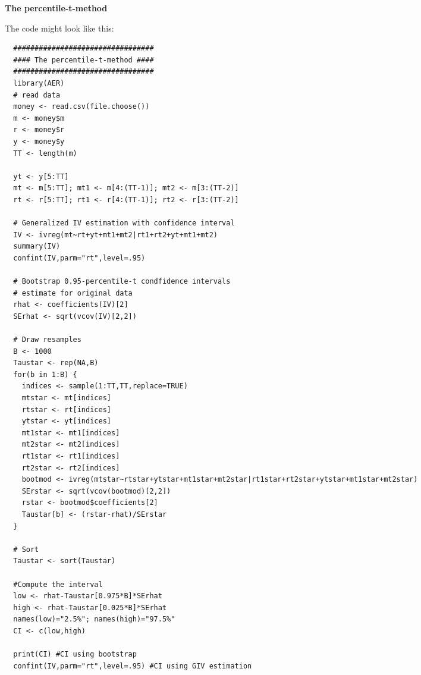 \begin{Solution}{16.5}
\textbf{The percentile-t-method }

The code might look like this:
\begin{verbatim}
  #################################
  #### The percentile-t-method ####
  #################################
  library(AER)
  # read data
  money <- read.csv(file.choose())
  m <- money$m
  r <- money$r
  y <- money$y
  TT <- length(m)

  yt <- y[5:TT]
  mt <- m[5:TT]; mt1 <- m[4:(TT-1)]; mt2 <- m[3:(TT-2)]
  rt <- r[5:TT]; rt1 <- r[4:(TT-1)]; rt2 <- r[3:(TT-2)]

  # Generalized IV estimation with confidence interval
  IV <- ivreg(mt~rt+yt+mt1+mt2|rt1+rt2+yt+mt1+mt2)
  summary(IV)
  confint(IV,parm="rt",level=.95)

  # Bootstrap 0.95-percentile-t condfidence intervals
  # estimate for original data
  rhat <- coefficients(IV)[2]
  SErhat <- sqrt(vcov(IV)[2,2])

  # Draw resamples
  B <- 1000
  Taustar <- rep(NA,B)
  for(b in 1:B) {
    indices <- sample(1:TT,TT,replace=TRUE)
    mtstar <- mt[indices]
    rtstar <- rt[indices]
    ytstar <- yt[indices]
    mt1star <- mt1[indices]
    mt2star <- mt2[indices]
    rt1star <- rt1[indices]
    rt2star <- rt2[indices]
    bootmod <- ivreg(mtstar~rtstar+ytstar+mt1star+mt2star|rt1star+rt2star+ytstar+mt1star+mt2star)
    SErstar <- sqrt(vcov(bootmod)[2,2])
    rstar <- bootmod$coefficients[2]
    Taustar[b] <- (rstar-rhat)/SErstar
  }

  # Sort
  Taustar <- sort(Taustar)

  #Compute the interval
  low <- rhat-Taustar[0.975*B]*SErhat
  high <- rhat-Taustar[0.025*B]*SErhat
  names(low)="2.5%"; names(high)="97.5%"
  CI <- c(low,high)

  print(CI) #CI using bootstrap
  confint(IV,parm="rt",level=.95) #CI using GIV estimation
\end{verbatim}
\end{Solution}
